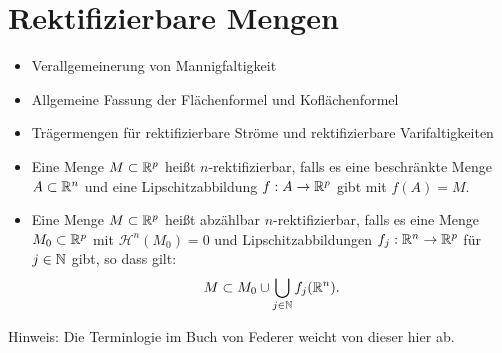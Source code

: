 \documentclass[a4paper,twoside,DIV15,BCOR12mm]{scrbook}
\newcommand{\HM}{\mathscr H}
\begin{document}
\section{Rektifizierbare Mengen}

\begin{motivation}
\begin{itemize}
\item Verallgemeinerung von Mannigfaltigkeit
\item Allgemeine Fassung der Flächenformel und Koflächenformel
\item Trägermengen für rektifizierbare Ströme und rektifizierbare Varifaltigkeiten
\end{itemize}
\end{motivation}

\begin{definition}
\begin{itemize}
\item Eine Menge $M\subset \mathbb{R}^p$ heißt $n$-rektifizierbar, falls es eine beschränkte Menge $A\subset\mathbb{R}^n$ und eine Lipschitzabbildung $f:A\to\mathbb{R}^p$ gibt mit $f(A)=M$. 
\item 
Eine Menge $M\subset \mathbb{R}^p$ heißt abzählbar $n$-rektifizierbar, falls es eine Menge $M_0\subset \mathbb{R}^p$ mit $\HM^n(M_0)=0$ und Lipschitzabbildungen $f_j:\mathbb{R}^n \to \mathbb{R}^p$ für $j\in \mathbb{N}$ gibt, so dass gilt:
\[
M \subset M_0 \cup \bigcup_{j\in\mathbb{N}} f_j(\mathbb{R}^n).
\]
\end{itemize}
\end{definition}

Hinweis: Die Terminlogie im Buch von Federer weicht von dieser hier ab.
\end{document}

